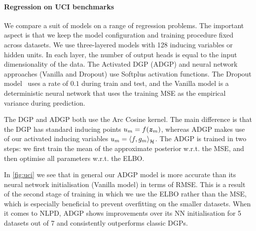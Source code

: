 \paragraph{Regression on UCI benchmarks}
We compare a suit of models on a range of regression problems. The important aspect is that we keep the model configuration and training procedure fixed across datasets. We use three-layered models with 128 inducing variables or hidden units. In each layer, the number of output heads is equal to the input dimensionality of the data. The Activated DGP (ADGP) and neural network approaches (Vanilla and Dropout) use Softplus activation functions. The Dropout model~\citep{Gal2016dropout} uses a rate of $0.1$ during train and test, and the Vanilla model is a deterministic neural network that uses the training MSE as the empirical variance during prediction.

The DGP and ADGP both use the Arc Cosine kernel. The main difference is that the DGP has standard inducing points $u_m = f(\bm{z}_m)$, whereas ADGP makes use of our activated inducing variables $u_m = \langle f, g_m \rangle_{{\mathcal{H}}}^{}$. The ADGP is trained in two steps: we first train the mean of the approximate posterior w.r.t. the MSE, and then optimise all parameters w.r.t. the ELBO.

In \cref{fig:uci} we see that in general our ADGP model is more accurate than its neural network initialisation (Vanilla model) in terms of RMSE. This is a result of the second stage of training in which we use the ELBO rather than the MSE, which is especially beneficial to prevent overfitting on the smaller datasets. When it comes to NLPD, ADGP shows improvements over its NN initialisation for 5 datasets out of 7 and consistently outperforms classic DGPs.


